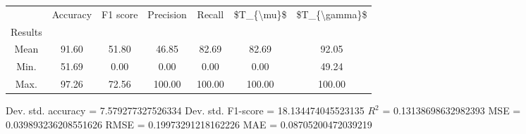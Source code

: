 \begin{tabular}{|c|c|c|c|c|c|c|}
\toprule
{} &  Accuracy &  F1 score &  Precision &  Recall &  \$T\_\{\textbackslash mu\}\$ &  \$T\_\{\textbackslash gamma\}\$ \\
Results &           &           &            &         &            &               \\
\hline
Mean    &     91.60 &     51.80 &      46.85 &   82.69 &      82.69 &         92.05 \\
Min.    &     51.69 &      0.00 &       0.00 &    0.00 &       0.00 &         49.24 \\
Max.    &     97.26 &     72.56 &     100.00 &  100.00 &     100.00 &        100.00 \\
\bottomrule
\end{tabular}

 Dev. std. accuracy = 7.579277327526334
 Dev. std. F1-score = 18.134474045523135
 $R^2$ = 0.13138698632982393
 MSE = 0.039893236208551626
 RMSE = 0.19973291218162226
 MAE = 0.08705200472039219